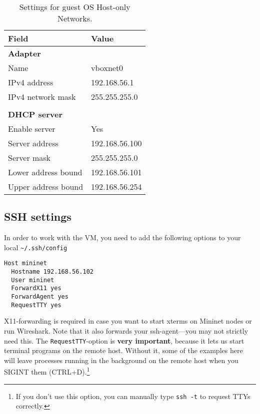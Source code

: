 \begin{table}[H]
  \centering
  \begin{tabular}{ll}
    \hline \textbf{Field} & \textbf{Value} \\
    \hline
      \textbf{Adapter} & \\
      Name & vboxnet0 \\
      IPv4 address & 192.168.56.1 \\
      IPv4 network mask & 255.255.255.0 \\
       & \\
      \textbf{DHCP server} & \\
      Enable server & Yes \\
      Server address & 192.168.56.100 \\
      Server mask & 255.255.255.0 \\
      Lower address bound & 192.168.56.101 \\
      Upper address bound & 192.168.56.254 \\
    \hline
  \end{tabular}
  \caption{Settings for guest OS Host-only Networks.}
  \label{table:hostonlynetworks.settings}
\end{table}

\subsection{SSH settings}
\label{chapter:ssh.setup}

In order to work with the VM, you need to add the following options to your
local \texttt{\~{}/.ssh/config}

\begin{verbatim}
Host mininet
  Hostname 192.168.56.102
  User mininet
  ForwardX11 yes
  ForwardAgent yes
  RequestTTY yes
\end{verbatim}

X11-forwarding is required in case you
want to start xterms on Mininet
nodes or run Wireshark.  Note that it also forwards your
ssh-agent---you may not strictly need this.  The \texttt{RequestTTY}-option
is \textbf{very important}, because it lets us start terminal programs on the remote
host. Without it, some of the examples here will leave processes running in
the background on the remote host when you SIGINT them (CTRL+D).\footnote{If
you don't use this option, you can manually type \texttt{ssh -t} to request
TTYs correctly.}

